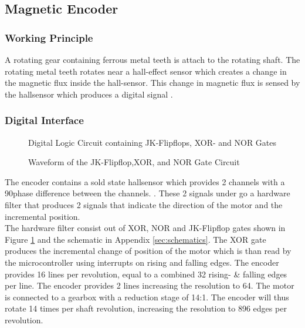 \subsection{Magnetic Encoder}
\subsubsection{Working Principle}
A rotating gear containing ferrous metal teeth is attach to the rotating shaft. The rotating metal teeth rotates near a hall-effect sensor which creates a change in the magnetic flux inside the hall-sensor. This change in magnetic flux is sensed by the hallsensor which produces a digital signal \citep{hallsensor}.
\subsubsection{Digital Interface} 

\begin{figure}[h]
	\centering
	
	\caption{Digital Logic Circuit containing JK-Flipflops, XOR- and NOR Gates}
	\label{fig:jk_xor}
\end{figure}

\begin{figure}[h]
	\centering
	
	\caption{Waveform of the JK-Flipflop,XOR, and NOR Gate Circuit}
	\label{fig:jk_xor_waveform}
\end{figure}

The encoder contains a sold state hallsensor which provides 2 channels with a 90\textdegree \space phase difference between the channels. \citep{faulhaberencoder}. These 2 signals under go a hardware filter that produces 2 signals that indicate the direction of the motor and the incremental position.\\

The hardware filter consist out of XOR, NOR and JK-Flipflop gates shown in Figure \ref{fig:jk_xor} and the schematic in Appendix \ref{sec:schematics}. The XOR gate produces the incremental change of position of the motor which is than read by the microcontroller using interrupts on rising and falling edges. The encoder provides 16 lines per revolution, equal to a combined 32 rising- \& falling edges per line. The encoder provides 2 lines increasing the resolution to 64. The motor is connected to a gearbox with a reduction stage of 14:1. The encoder will thus rotate 14 times per shaft revolution, increasing the resolution to 896 edges per revolution.\\


